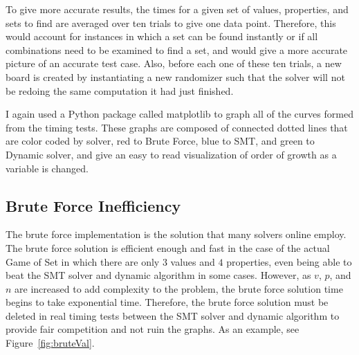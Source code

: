 \documentclass[pageno]{jpaper}
\begin{document}
To give more accurate results, the times for a given set of values, properties, and sets to find are averaged over ten trials to give one data point. Therefore, this would account for instances in which a set can be found instantly or if all combinations need to be examined to find a set, and would give a more accurate picture of an accurate test case. Also, before each one of these ten trials, a new board is created by instantiating a new randomizer such that the solver will not be redoing the same computation it had just finished. 

I again used a Python package called matplotlib to graph all of the curves formed from the timing tests. These graphs are composed of connected dotted lines that are color coded by solver, red to Brute Force, blue to SMT, and green to Dynamic solver, and give an easy to read visualization of order of growth as a variable is changed. 





\subsection{Brute Force Inefficiency}

The brute force implementation is the solution that many solvers online employ. The brute force solution is efficient enough and fast in the case of the actual Game of Set in which there are only $3$ values and $4$ properties, even being able to beat the SMT solver and dynamic algorithm in some cases. However, as $v$, $p$, and $n$ are increased to add complexity to the problem, the brute force solution time begins to take exponential time. Therefore, the brute force solution must be deleted in real timing tests between the SMT solver and dynamic algorithm to provide fair competition and not ruin the graphs. As an example, see Figure~\ref{fig:bruteVal}.
\end{document}
